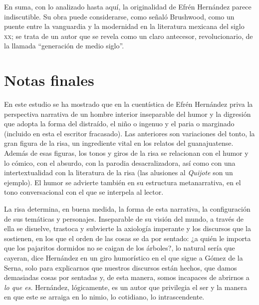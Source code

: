\documentclass[14pt,twoside,final]{extbook} %
\begin{document}
En suma, con lo analizado hasta aquí, la originalidad de Efrén Hernández parece indiscutible. Su obra
puede considerarse, como señaló Brushwood, como un puente entre la vanguardia y la modernidad en la literatura mexicana del siglo \textsc{xx}; se trata de un autor que se revela como un claro antecesor, revolucionario, de la llamada ``generación de medio siglo''.
\chapter[\textsc{Notas finales}]{Notas finales}\label{ch:notas-finales}
\BgThispage
\thispagestyle{empty}
\pagestyle{fancy}
\fancyhf{} %
\fancyhead[RO,LE]{\thepage}
\renewcommand{\headrulewidth}{0pt}
En este estudio se ha mostrado que en la cuentística de Efrén Hernández priva la perspectiva narrativa de un hombre interior inseparable del humor y la digresión que adopta la forma del distraído, el niño o ingenuo y el paria o marginado (incluido en esta el escritor fracasado). Las anteriores son variaciones del tonto, la gran figura de la risa, un ingrediente vital en los relatos del guanajuatense. Además de esas figuras, los tonos y giros de la risa se relacionan con el humor y lo cómico, con el absurdo, con la parodia desacralizadora, así como con una intertextualidad con la literatura de la risa (las alusiones al \emph{Quijote} son un ejemplo). El humor se advierte también en su estructura metanarrativa, en el tono conversacional con el que se interpela al lector.

La risa determina, en buena medida, la forma de esta narrativa, la configuración de sus temáticas y personajes. Inseparable de su visión del mundo, a través de ella se disuelve, trastoca y subvierte la axiología imperante y los discursos que la sostienen, en los que el orden de las cosas se da por sentado: ¿a quién le importa que los pajaritos dormidos no se caigan de los árboles?, lo natural sería que cayeran, dice Hernández en un giro humorístico en el que sigue a Gómez de la Serna, solo para explicarnos que nuestros discursos están hechos, que damos demasiadas cosas por sentadas y, de esta manera, somos incapaces de abrirnos a \emph{lo que es.} Hernández, lógicamente, es un autor que privilegia el ser y la manera en que este se arraiga en lo nimio, lo cotidiano, lo intrascendente.
\end{document}
